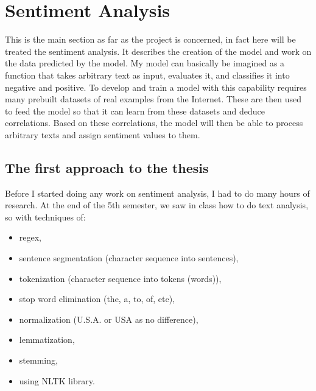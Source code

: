 \section{Sentiment Analysis}
This is the main section as far as the project is concerned, in fact here will be treated the sentiment analysis. It describes the creation of the model and work on the data predicted by the model.
My model can basically be imagined as a function that takes arbitrary text as input, evaluates it, and classifies it into negative and positive.
To develop and train a model with this capability requires many prebuilt datasets of real examples from the Internet. These are then used to feed the model so that it can learn from these datasets and deduce correlations. Based on these correlations, the model will then be able to process arbitrary texts and assign sentiment values to them.

\subsection{The first approach to the thesis}
Before I started doing any work on sentiment analysis, I had to do many hours of research.
At the end of the 5th semester, we saw in class how to do text analysis, so with techniques of:
\begin{itemize}
    \item regex,
    \item sentence segmentation (character sequence into sentences), 
    \item tokenization (character sequence into tokens (words)),
    \item stop word elimination (the, a, to, of, etc),
    \item normalization (U.S.A. or USA as no difference),
    \item lemmatization,
    \item stemming,
    \item using NLTK library.
\end{itemize}

